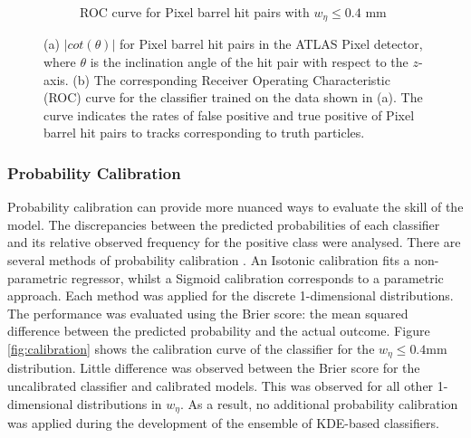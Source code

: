 \begin{figure}[!htbp]
\begin{subfigure}[b]{0.9\textwidth}
        \caption{ROC curve for Pixel barrel hit pairs with $w_{\eta} \leq 0.4$ mm }
        \label{fig:roc-curve}
    \end{subfigure}
\caption{(a) $\lvert cot(\theta) \rvert$ for Pixel barrel hit pairs in the ATLAS Pixel detector, where $\theta$ is the inclination angle of the hit pair with respect to the $z$-axis. (b) The corresponding Receiver Operating Characteristic (ROC) curve for the classifier trained on the data shown in (a). The curve indicates the rates of false positive and true positive of Pixel barrel hit pairs to tracks corresponding to truth particles.}
\label{fig:1-dimensional-classifier-training}
\end{figure}


\subsubsection{Probability Calibration}


Probability calibration can provide more nuanced ways to evaluate the skill of the model. The discrepancies between the predicted probabilities of each classifier and its relative observed frequency for the positive class were analysed. There are several methods of probability calibration \cite{prob-calibration}. An Isotonic calibration fits a non-parametric regressor, whilst a Sigmoid calibration corresponds to a parametric approach. Each method was applied for the discrete 1-dimensional distributions. The performance was evaluated using the Brier score: the mean squared difference between the predicted probability and the actual outcome. Figure \ref{fig:calibration} shows the calibration curve of the classifier for the $w_{\eta} \leq 0.4$mm distribution. Little difference was observed between the Brier score for the uncalibrated classifier and calibrated models. This was observed for all other 1-dimensional distributions in $w_{\eta}$. As a result, no additional probability calibration was applied during the development of the ensemble of KDE-based classifiers.


